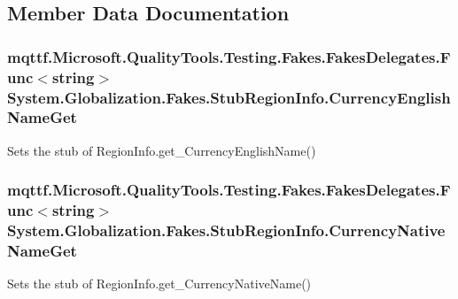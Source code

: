 \subsection{Member Data Documentation}
\hypertarget{class_system_1_1_globalization_1_1_fakes_1_1_stub_region_info_a936a45d74fbc2a2ae27f3d664974e441}{
\subsubsection[{Currency\-English\-Name\-Get}]{\setlength{\rightskip}{0pt plus 5cm}mqttf.\-Microsoft.\-Quality\-Tools.\-Testing.\-Fakes.\-Fakes\-Delegates.\-Func$<$string$>$ System.\-Globalization.\-Fakes.\-Stub\-Region\-Info.\-Currency\-English\-Name\-Get}}\label{class_system_1_1_globalization_1_1_fakes_1_1_stub_region_info_a936a45d74fbc2a2ae27f3d664974e441}


Sets the stub of Region\-Info.\-get\-\_\-\-Currency\-English\-Name()

\hypertarget{class_system_1_1_globalization_1_1_fakes_1_1_stub_region_info_a19e56070e4a3c5fe1eeb3fd7a34a24f9}{
\subsubsection[{Currency\-Native\-Name\-Get}]{\setlength{\rightskip}{0pt plus 5cm}mqttf.\-Microsoft.\-Quality\-Tools.\-Testing.\-Fakes.\-Fakes\-Delegates.\-Func$<$string$>$ System.\-Globalization.\-Fakes.\-Stub\-Region\-Info.\-Currency\-Native\-Name\-Get}}\label{class_system_1_1_globalization_1_1_fakes_1_1_stub_region_info_a19e56070e4a3c5fe1eeb3fd7a34a24f9}


Sets the stub of Region\-Info.\-get\-\_\-\-Currency\-Native\-Name()

